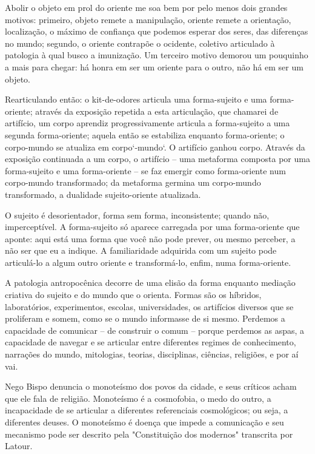 Abolir o objeto em prol do oriente me soa bem por pelo menos dois grandes motivos: primeiro, objeto remete a manipulação, oriente remete a orientação, localização, o máximo de confiança que podemos esperar dos seres, das diferenças no mundo; segundo, o oriente contrapõe o ocidente, coletivo articulado à patologia à qual busco a imunização. Um terceiro motivo demorou um pouquinho a mais para chegar: há honra em ser um oriente para o outro, não há em ser um objeto.

Rearticulando então: o kit-de-odores articula uma forma-sujeito e uma forma-oriente; através da exposição repetida a esta articulação, que chamarei de artifício, um corpo aprendiz progressivamente articula a forma-sujeito a uma segunda forma-oriente; aquela então se estabiliza enquanto forma-oriente; o corpo-mundo se atualiza em corpo`-mundo`. O artifício \guillemetleft ganhou corpo\guillemetright. Através da exposição continuada a um corpo, o artifício -- uma metaforma composta por uma forma-sujeito e uma forma-oriente -- se faz emergir como forma-oriente num corpo-mundo transformado; da metaforma germina um corpo-mundo transformado, a dualidade sujeito-oriente atualizada.

O sujeito é desorientador, forma sem forma, inconsistente; quando não, imperceptível. A forma-sujeito só aparece carregada por uma forma-oriente que aponte: aqui está uma forma que você não pode prever, ou mesmo perceber, a não ser que eu a indique. A familiaridade adquirida com um sujeito pode articulá-lo a algum outro oriente e transformá-lo, enfim, numa forma-oriente.

A patologia antropocênica decorre de uma elisão da forma enquanto mediação criativa do sujeito e do mundo que o orienta. Formas são os híbridos, laboratórios, experimentos, escolas, universidades, os artifícios diversos que se proliferam e somem, como se o mundo informasse de si mesmo. Perdemos a capacidade de comunicar -- de construir o comum -- porque perdemos as aspas, a capacidade de navegar e se articular entre diferentes regimes de conhecimento, narrações do mundo, mitologias, teorias, disciplinas, ciências, religiões, e por aí vai.

Nego Bispo denuncia o monoteísmo dos povos da cidade, e seus críticos acham que ele fala de religião. Monoteísmo é a cosmofobia, o medo do outro, a incapacidade de se articular a diferentes referenciais cosmológicos; ou seja, a diferentes deuses. O monoteísmo é doença que impede a comunicação e seu mecanismo pode ser descrito pela "Constituição dos modernos" transcrita por Latour.

